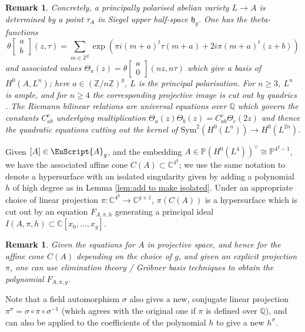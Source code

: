 \documentclass[11pt]{amsart}
\newtheorem{remark}[thm]{Remark}
\newcommand{\scrA}{\EuScript{A}}
\newcommand{\bZ}{\mathbb{Z}}
\newcommand{\bQ}{\mathbb{Q}}
\newcommand{\bC}{\mathbb{C}}
\newcommand{\bP}{\mathbb{P}}
\newcommand{\Sym}{\mathrm{Sym}}
\numberwithin{equation}{section}
\renewcommand{\geq}{\geqslant}
\begin{document}
\begin{remark}
	Concretely, a principally polarised abelian variety $L \to A$ is determined by a point $\tau_A$ in Siegel upper half-space $\mathfrak{h}_g$. One has the theta-functions
	\[
		\theta \left[\begin{matrix} a \\ b \end{matrix} \right](z,\tau) = \sum_{m \in \bZ^g} \exp \left(\pi i (m+a)^t \tau (m+a) + 2i\pi (m+a)^t (z+b) \right)
	\]
	and associated values $\Theta_a(z) = \theta\left[\begin{matrix} a \\ 0 \end{matrix} \right](nz,n\tau)$ which give a basis of $H^0(A,L^n)$; here $a \in (\bZ/n\bZ)^g$, $L$ is the principal polarisation. For $n\geq 3$, $L^n$ is ample, and for $n\geq 4$ the corresponding projective image is cut out by quadrics \cite{Mumford1}.  The Riemann bilinear relations are universal equations over $\bQ$ which govern the constants $C_{ab}^c$ underlying  multiplication $\Theta_a(z)\Theta_b(z) = C_{ab}^c \Theta_c(2z)$ and thence the quadratic equations cutting out the kernel of $\Sym^2(H^0(L^n)) \to H^0(L^{2n})$.
\end{remark}

Given $[A] \in \scrA_g$, and the embedding $A \in \bP(H^0(L^4))^{\vee} \cong \bP^{4^g-1}$, we have the associated affine cone $C(A) \subset \bC^{4^g}$; we use the same notation to denote a hypersurface with an isolated singularity given by adding a polynomial $h$ of high degree as in Lemma \ref{lem:add to make isolated}. Under an appropriate choice of linear projection $\pi: \bC^{4^g} \to \bC^{g+1}$, $\pi(C(A))$ is a hypersurface which is cut out by an equation $F_{A,\pi,h}$ generating a principal ideal $I(A,\pi,h) \subset \bC[x_0,\ldots,x_g]$.

\begin{remark}
	Given the equations for $A$ in projective space, and hence for the affine cone $C(A)$ depending on the choice of $g$, and given an explicit projection $\pi$, one can use elimination theory / Gr\"obner basis techniques to obtain the polynomial $F_{A,\pi,g}$.
\end{remark}

Note that a field automorphism $\sigma$ also gives a new, conjugate linear projection $\pi^{\sigma} = \sigma \circ \pi \circ \sigma^{-1}$ (which agrees with the original one if $\pi$ is defined over $\bQ$), and can also be applied to the coefficients of the polynomial $h$ to give a new $h^{\sigma}$.
\end{document}
